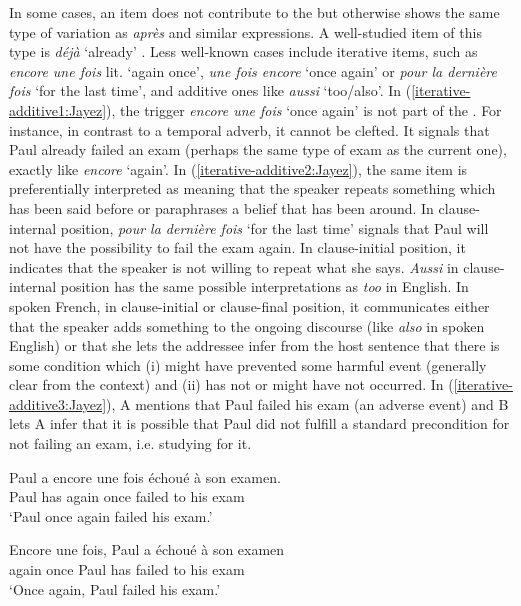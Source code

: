 \documentclass[output=paper,colorlinks,citecolor=brown]{langscibook}
\begin{document}
In some cases, an item does not contribute to the  but otherwise shows the same type of variation as \textit{après} and similar expressions. A well-studied item of this type is \textit{déjà} `already' \citep{MH:2008,Squartini:2014}. Less well-known cases include iterative items, such as \textit{encore une fois} lit. `again once', \textit{une fois encore} `once again' or \textit{pour la dernière fois} `for the last time', and additive ones like \textit{aussi} `too/also'. In (\ref{iterative-additive1:Jayez}), the  trigger \textit{encore une fois} `once again' is not part of the . For instance, in contrast to a temporal adverb, it cannot be clefted. It signals that Paul already failed an exam (perhaps the same type of exam as the current one), exactly like \textit{encore} `again'. In (\ref{iterative-additive2:Jayez}), the same item is preferentially interpreted as meaning that the speaker repeats something which has been said before or paraphrases a belief that has been around. In clause-internal position, \textit{pour la dernière fois} `for the last time' signals that Paul will not have the possibility to fail the exam again. In clause-initial position, it indicates that the speaker is not willing to repeat what she says. \textit{Aussi} in clause-internal position has the same possible interpretations as \textit{too} in English. In spoken French, in clause-initial or clause-final position, it communicates either that the speaker adds something to the ongoing discourse (like \textit{also} in spoken English) or that she lets the addressee infer from the host sentence that there is some condition which (i) might have prevented some harmful event (generally clear from the context) and (ii) has not or might have not occurred. In (\ref{iterative-additive3:Jayez}), A mentions that Paul failed his exam (an adverse event) and B lets A infer that it is possible that Paul did not fulfill a standard precondition for not failing an exam, i.e. studying for it.


\ea
\label{iterative-additive1:Jayez}
\gll Paul a encore {une fois} échoué à son examen.\\
Paul has again once failed to his exam\\
\glt `Paul once again failed his exam.'
\z

\ea
\label{iterative-additive2:Jayez}
\gll Encore {une fois}, Paul a échoué à son examen\\
again once Paul has failed to his exam\\
\glt `Once again, Paul failed his exam.'
\z
\end{document}
